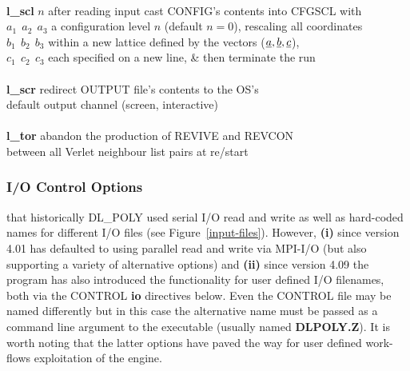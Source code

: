\begin{tabbing}
\>                                              \> \\
\> {\bf l\_scl} \phantom{xxx} $n$               \> after reading input cast CONFIG's contents into CFGSCL with \\
\> \phantom{xxxxxxxx} $a_{1}~~a_{2}~~a_{3}$     \> a configuration level $n$ (default $n=0$), rescaling all coordinates \\
\> \phantom{xxxxxxxx} $b_{1}~~b_{2}~~b_{3}$     \> within a new lattice defined by the vectors ($\mbox{$\underline{a}$},\mbox{$\underline{b}$},\mbox{$\underline{c}$}$), \\
\> \phantom{xxxxxxxx} $c_{1}~~c_{2}~~c_{3}$     \> each specified on a new line, \& then terminate the run \\
\>                                              \> \\
\> {\bf l\_scr}                                 \> redirect OUTPUT file's contents to the OS's \\
\>                                              \> default output channel (screen, interactive) \\
\>                                              \> \\
\> {\bf l\_tor}                                 \> abandon the production of REVIVE and REVCON \\
\>                                              \> between all Verlet neighbour list pairs at re/start
\end{tabbing}

\subsubsection{I/O Control Options}
\label{io}

 that historically DL\_POLY used serial I/O read
and write as well as hard-coded names for different I/O files (see
Figure~\ref{input-files}).  However, {\bf (i)} since version 4.01
\D has defaulted to using parallel read and write via MPI-I/O
(but also supporting a variety of alternative options) and
{\bf (ii)} since version 4.09 the program has also introduced the
functionality for user defined I/O filenames, both via the CONTROL
{\bf io} directives below.  Even the CONTROL file may be named
differently but in this case the alternative name must be passed
as a command line argument to the \D executable (usually named
{\bf DLPOLY.Z}).  It is worth noting that the latter options have
paved the way for user defined work-flows exploitation of the \D engine.

